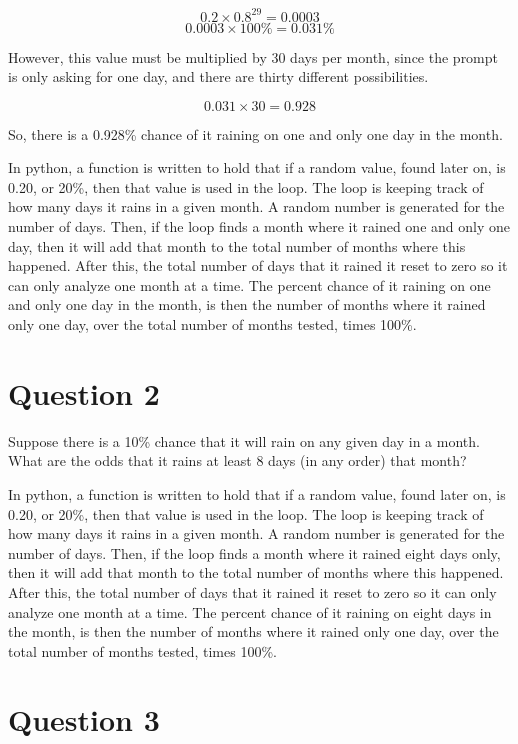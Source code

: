 \documentclass{revtex4}
\begin{document}
\[0.2 \times 0.8^{29} = 0.0003\]
\[0.0003 \times 100\% = 0.031\% \]

However, this value must be multiplied by 30 days per month, since the prompt is only asking for one day, and there are thirty different possibilities.  

\[0.031 \times 30 = 0.928 \]

So, there is a 0.928\% chance of it raining on one and only one day in the month. 

In python, a function is written to hold that if a random value, found later on, is 0.20, or 20\%, then that value is used in the loop. The loop is keeping track of how many days it rains in a given month. A random number is generated for the number of days. Then, if the loop finds a month where it rained one and only one day, then it will add that month to the total number of months where this happened. After this, the total number of days that it rained it reset to zero so it can only analyze one month at a time. The percent chance of it raining on one and only one day in the month, is then the number of months where it rained only one day, over the total number of months tested, times 100\%. 

\section*{Question 2}

Suppose there is a 10\% chance that it will rain on any given day in a month. What are the odds that it rains at least 8 days (in any order) that month?

In python, a function is written to hold that if a random value, found later on, is 0.20, or 20\%, then that value is used in the loop. The loop is keeping track of how many days it rains in a given month. A random number is generated for the number of days. Then, if the loop finds a month where it rained eight days only, then it will add that month to the total number of months where this happened. After this, the total number of days that it rained it reset to zero so it can only analyze one month at a time. The percent chance of it raining on eight days in the month, is then the number of months where it rained only one day, over the total number of months tested, times 100\%. 

\section*{Question 3}
\end{document}
